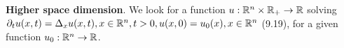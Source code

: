 {\bf Higher space dimension}. We look for a function $u: \mathbb{R}^n \times \mathbb{R}_+ \rightarrow \mathbb{R}$ solving $\partial_t u(x,t) = \Delta_x u(x,t), x \in \mathbb{R}^n, t > 0, u(x,0) = u_0 (x), x \in \mathbb{R}^n$ (9.19), for a given function $u_0: \mathbb{R}^n \rightarrow \mathbb{R}$. 